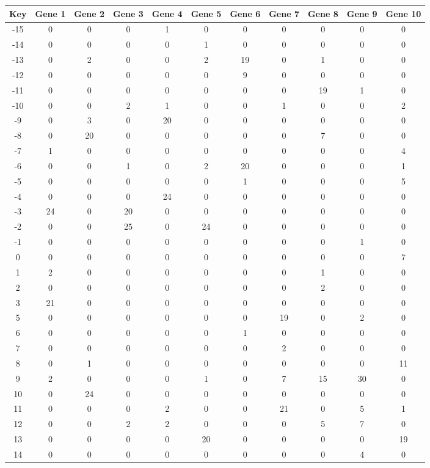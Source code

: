 \begin{tabular}{|c|c|c|c|c|c|c|c|c|c|c|}
\hline
Key & Gene 1 & Gene 2 & Gene 3 & Gene 4 & Gene 5 & Gene 6 & Gene 7 & Gene 8 & Gene 9 & Gene 10 \\
\hline
-15 & 0 & 0 & 0 & 1 & 0 & 0 & 0 & 0 & 0 & 0 \\
-14 & 0 & 0 & 0 & 0 & 1 & 0 & 0 & 0 & 0 & 0 \\
-13 & 0 & 2 & 0 & 0 & 2 & 19 & 0 & 1 & 0 & 0 \\
-12 & 0 & 0 & 0 & 0 & 0 & 9 & 0 & 0 & 0 & 0 \\
-11 & 0 & 0 & 0 & 0 & 0 & 0 & 0 & 19 & 1 & 0 \\
-10 & 0 & 0 & 2 & 1 & 0 & 0 & 1 & 0 & 0 & 2 \\
-9 & 0 & 3 & 0 & 20 & 0 & 0 & 0 & 0 & 0 & 0 \\
-8 & 0 & 20 & 0 & 0 & 0 & 0 & 0 & 7 & 0 & 0 \\
-7 & 1 & 0 & 0 & 0 & 0 & 0 & 0 & 0 & 0 & 4 \\
-6 & 0 & 0 & 1 & 0 & 2 & 20 & 0 & 0 & 0 & 1 \\
-5 & 0 & 0 & 0 & 0 & 0 & 1 & 0 & 0 & 0 & 5 \\
-4 & 0 & 0 & 0 & 24 & 0 & 0 & 0 & 0 & 0 & 0 \\
-3 & 24 & 0 & 20 & 0 & 0 & 0 & 0 & 0 & 0 & 0 \\
-2 & 0 & 0 & 25 & 0 & 24 & 0 & 0 & 0 & 0 & 0 \\
-1 & 0 & 0 & 0 & 0 & 0 & 0 & 0 & 0 & 1 & 0 \\
0 & 0 & 0 & 0 & 0 & 0 & 0 & 0 & 0 & 0 & 7 \\
1 & 2 & 0 & 0 & 0 & 0 & 0 & 0 & 1 & 0 & 0 \\
2 & 0 & 0 & 0 & 0 & 0 & 0 & 0 & 2 & 0 & 0 \\
3 & 21 & 0 & 0 & 0 & 0 & 0 & 0 & 0 & 0 & 0 \\
5 & 0 & 0 & 0 & 0 & 0 & 0 & 19 & 0 & 2 & 0 \\
6 & 0 & 0 & 0 & 0 & 0 & 1 & 0 & 0 & 0 & 0 \\
7 & 0 & 0 & 0 & 0 & 0 & 0 & 2 & 0 & 0 & 0 \\
8 & 0 & 1 & 0 & 0 & 0 & 0 & 0 & 0 & 0 & 11 \\
9 & 2 & 0 & 0 & 0 & 1 & 0 & 7 & 15 & 30 & 0 \\
10 & 0 & 24 & 0 & 0 & 0 & 0 & 0 & 0 & 0 & 0 \\
11 & 0 & 0 & 0 & 2 & 0 & 0 & 21 & 0 & 5 & 1 \\
12 & 0 & 0 & 2 & 2 & 0 & 0 & 0 & 5 & 7 & 0 \\
13 & 0 & 0 & 0 & 0 & 20 & 0 & 0 & 0 & 0 & 19 \\
14 & 0 & 0 & 0 & 0 & 0 & 0 & 0 & 0 & 4 & 0 \\
\hline
\end{tabular}